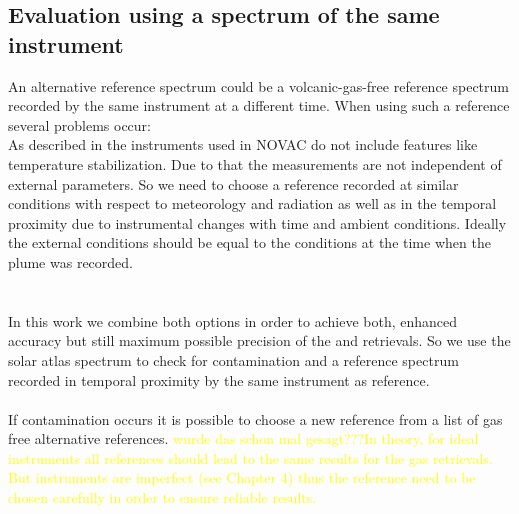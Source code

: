 \subsection*{Evaluation using a spectrum of the same instrument}
An alternative reference spectrum could be a volcanic-gas-free reference
spectrum recorded by the same instrument at a different time. When using such a reference several problems occur:\\
As described in  the instruments used in NOVAC do not include features like temperature stabilization. Due to that the measurements are not independent of external parameters. 
So we need to choose a reference recorded at similar conditions with respect to meteorology and	radiation as well as in the temporal proximity due to instrumental changes with time and ambient conditions. Ideally the external conditions should be equal to the conditions at the time when the plume was recorded.\\
\\
%
\\
In this work we combine both options in order to
achieve both, enhanced accuracy but still maximum possible precision of
the  and  retrievals. So we use the solar atlas spectrum to check for 
contamination and a reference spectrum recorded in temporal proximity by the same instrument as reference.\\
\\
If contamination occurs it is possible to choose a new reference from a list of gas free alternative references. \textcolor{yellow}{wurde das schon mal gesagt???In theory, for ideal instruments all references should lead to
	the same results for the gas retrievals. But instruments are imperfect (see Chapter
	4) thus the reference need to be chosen carefully in order to ensure reliable results.}\\
%
\\
